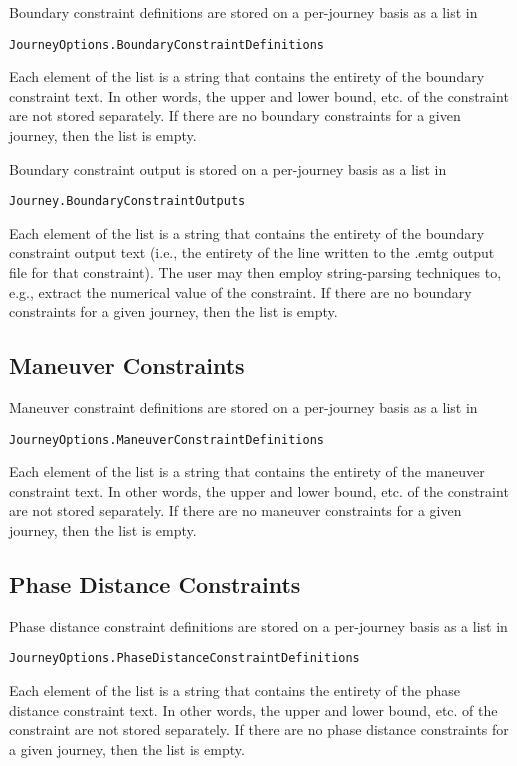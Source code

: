 \documentclass[11pt]{article}
\begin{document}
Boundary constraint definitions are stored on a per-journey basis as a list in

\begin{verbatim}
JourneyOptions.BoundaryConstraintDefinitions
\end{verbatim}
 
Each element of the list is a string that contains the entirety of the boundary constraint text. In other words, the upper and lower bound, etc. of the constraint are not stored separately. If there are no boundary constraints for a given journey, then the list is empty.

Boundary constraint output is stored on a per-journey basis as a list in

\begin{verbatim}
Journey.BoundaryConstraintOutputs
\end{verbatim}

Each element of the list is a string that contains the entirety of the boundary constraint output text (i.e., the entirety of the line written to the .emtg output file for that constraint). The user may then employ string-parsing techniques to, e.g., extract the numerical value of the constraint. If there are no boundary constraints for a given journey, then the list is empty.

\subsection{Maneuver Constraints}
\label{sec:PyemtgManueverConstraints}

Maneuver constraint definitions are stored on a per-journey basis as a list in

\begin{verbatim}
JourneyOptions.ManeuverConstraintDefinitions
\end{verbatim}

Each element of the list is a string that contains the entirety of the maneuver constraint text. In other words, the upper and lower bound, etc. of the constraint are not stored separately. If there are no maneuver constraints for a given journey, then the list is empty.

\subsection{Phase Distance Constraints}
\label{sec:PyemtgPhaseDistanceConstraints}

Phase distance constraint definitions are stored on a per-journey basis as a list in

\begin{verbatim}
JourneyOptions.PhaseDistanceConstraintDefinitions
\end{verbatim}

Each element of the list is a string that contains the entirety of the phase distance constraint text. In other words, the upper and lower bound, etc. of the constraint are not stored separately. If there are no phase distance constraints for a given journey, then the list is empty.

%
%
\end{document}
